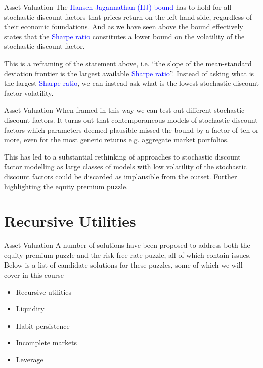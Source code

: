 \documentclass[aspectratio=169,xcolor=dvipsnames]{beamer}
\begin{document}
\begin{frame}{Asset Valuation}
    The \textcolor{blue}{Hansen-Jagannathan (HJ) bound} has to hold for all stochastic discount factors that prices return on the left-hand side, regardless of their economic foundations. And as we have seen above the bound effectively states that the \textcolor{blue}{Sharpe ratio} constitutes a lower bound on the volatility of the stochastic discount factor.

    This is a reframing of the statement above, i.e. ``the slope of the mean-standard deviation frontier is the largest available \textcolor{blue}{Sharpe ratio}''. Instead of asking what is the largest \textcolor{blue}{Sharpe ratio}, we can instead ask what is the lowest stochastic discount factor volatility.
\end{frame}

\begin{frame}{Asset Valuation}
    When framed in this way we can test out different stochastic discount factors. It turns out that contemporaneous models of stochastic discount factors which parameters deemed plausible missed the bound by a factor of ten or more, even for the most generic returns e.g. aggregate market portfolios.

    This has led to a substantial rethinking of approaches to stochastic discount factor modelling as large classes of models with low volatility of the stochastic discount factors could be discarded as implausible from the outset. Further highlighting the equity premium puzzle.
\end{frame}

\section{Recursive Utilities}

\begin{frame}{Asset Valuation}
    A number of solutions have been proposed to address both the equity premium puzzle and the risk-free rate puzzle, all of which contain issues. Below is a list of candidate solutions for these puzzles, some of which we will cover in this course
    \begin{itemize}
        \item Recursive utilities
        \item Liquidity
        \item Habit persistence
        \item Incomplete markets
        \item Leverage
    \end{itemize}
\end{frame}
\end{document}
